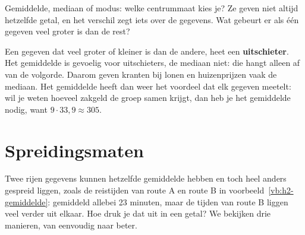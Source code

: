 Gemiddelde, mediaan of modus: welke centrummaat kies je? Ze geven niet altijd hetzelfde getal, en het verschil zegt iets over de gegevens. Wat gebeurt er als één gegeven veel groter is dan de rest?


Een gegeven dat veel groter of kleiner is dan de andere, heet een \textbf{uitschieter}. Het gemiddelde is gevoelig voor uitschieters, de mediaan niet: die hangt alleen af van de volgorde. Daarom geven kranten bij lonen en huizenprijzen vaak de mediaan. Het gemiddelde heeft dan weer het voordeel dat elk gegeven meetelt: wil je weten hoeveel zakgeld de groep samen krijgt, dan heb je het gemiddelde nodig, want $9 \cdot 33,9 \approx 305$.

\begin{oefeningen}
\end{oefeningen}

\section{Spreidingsmaten}

Twee rijen gegevens kunnen hetzelfde gemiddelde hebben en toch heel anders gespreid liggen, zoals de reistijden van route A en route B in voorbeeld~\ref{vb:h2-gemiddelde}: gemiddeld allebei 23 minuten, maar de tijden van route B liggen veel verder uit elkaar. Hoe druk je dat uit in een getal? We bekijken drie manieren, van eenvoudig naar beter.


